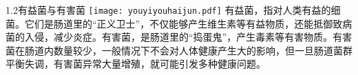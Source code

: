 

\usepackage{graphicx}
\graphicspath{{cores/}}



\vspace*{4mm}
\setlength{\arrayrulewidth}{1pt}
\fontsize{9.3pt}{11pt}\selectfont
\color{gray2}

\begin{spacing}{1.25}
\begin{LRaside}[.8]{\fontsize{11pt}{11pt}\selectfont 1.2有益菌与有害菌}
\noindent
\texttt{[image: youyiyouhaijun.pdf]}
\asidebreak %
有益菌，指对人类有益的细菌。它们是肠道里的“正义卫士”，不仅能够产生维生素等有益物质，还能抵御致病菌的入侵，减少炎症。有害菌，是肠道里的“捣蛋鬼”，产生毒素等有害物质。有害菌在肠道内数量较少，一般情况下不会对人体健康产生大的影响，但一旦肠道菌群平衡失调，有害菌异常大量增殖，就可能引发多种健康问题。
\end{LRaside}
\end{spacing}

